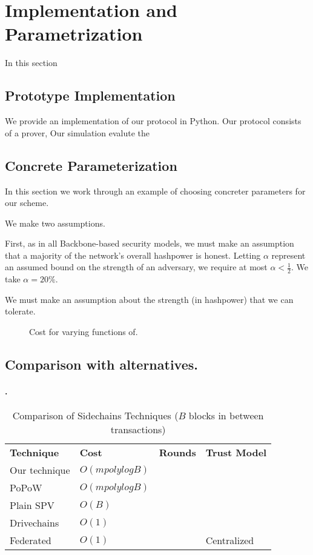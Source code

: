 \section{Implementation and Parametrization}
In this section

\subsection{Prototype Implementation}
We provide an implementation of our protocol in Python. Our protocol consists of a prover, 
Our simulation evalute the

\subsection{Concrete Parameterization}
In this section we work through an example of choosing concreter parameters for our scheme.

We make two assumptions.

First, as in all Backbone-based security models, we must make an assumption that a majority of the network's overall hashpower is honest. Letting $\alpha$ represent an assumed bound on the strength of an adversary,
we require at most $\alpha < \frac{1}{2}$.
We take $\alpha = 20\%$.

We must make an assumption about the strength (in hashpower) that we can tolerate.

\begin{figure}
  \caption{Cost for varying functions of.}
\end{figure}


\subsection{Comparison with alternatives.}

\paragraph{.}

\begin{table}
  \caption{Comparison of Sidechains Techniques ($B$ blocks in between transactions)}
  \begin{tabular}{llll}
    {\bf Technique}  & {\bf Cost}       & {\bf Rounds}    & {\bf Trust Model} \\
    Our technique    & $O(m polylog B)$ &              & \\
    PoPoW~\cite{kls} & $O(m polylog B)$ &              & \\
    Plain SPV        &   $O(B)$         & & \\
Drivechains~\cite{sztorc}& $O(1)$       &              & \\
    Federated        &     $O(1)$       &              & Centralized \\
  \end{tabular}
\end{table}

